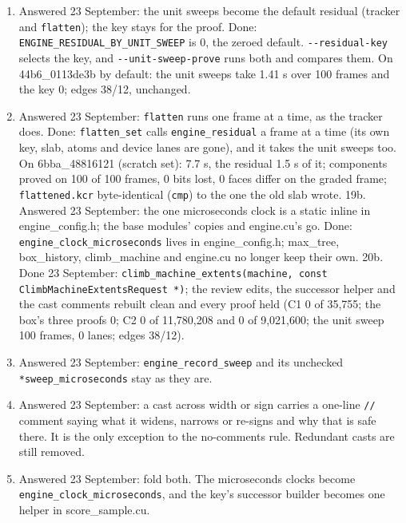 \begin{enumerate}
\item Answered 23 September: the unit sweeps become the default residual (tracker and \texttt{flatten}); the key stays for the proof. Done: \texttt{ENGINE\_\allowbreak{}RESIDUAL\_\allowbreak{}BY\_\allowbreak{}UNIT\_\allowbreak{}SWEEP} is 0, the zeroed default. \texttt{-\allowbreak{}-\allowbreak{}residual-\allowbreak{}key} selects the key, and \texttt{-\allowbreak{}-\allowbreak{}unit-\allowbreak{}sweep-\allowbreak{}prove} runs both and compares them. On 44b6\_\allowbreak{}0113de3b by default: the unit sweeps take 1.41 s over 100 frames and the key 0; edges 38/12, unchanged.
\item Answered 23 September: \texttt{flatten} runs one frame at a time, as the tracker does. Done: \texttt{flatten\_\allowbreak{}set} calls \texttt{engine\_\allowbreak{}residual} a frame at a time (its own key, slab, atoms and device lanes are gone), and it takes the unit sweeps too. On 6bba\_\allowbreak{}48816121 (scratch set): 7.7 s, the residual 1.5 s of it; components proved on 100 of 100 frames, 0 bits lost, 0 faces differ on the graded frame; \texttt{flattened.\allowbreak{}kcr} byte-identical (\texttt{cmp}) to the one the old slab wrote. 19b. Answered 23 September: the one microseconds clock is a static inline in engine\_\allowbreak{}config.h; the base modules' copies and engine.cu's go. Done: \texttt{engine\_\allowbreak{}clock\_\allowbreak{}microseconds} lives in engine\_\allowbreak{}config.h; max\_\allowbreak{}tree, box\_\allowbreak{}history, climb\_\allowbreak{}machine and engine.cu no longer keep their own. 20b. Done 23 September: \texttt{climb\_\allowbreak{}machine\_\allowbreak{}extents(machine, const Climb\allowbreak{}Machine\allowbreak{}Extents\allowbreak{}Request *)}; the review edits, the successor helper and the cast comments rebuilt clean and every proof held (C1 0 of 35,755; the box's three proofs 0; C2 0 of 11,780,208 and 0 of 9,021,600; the unit sweep 100 frames, 0 lanes; edges 38/12).
\item Answered 23 September: \texttt{engine\_\allowbreak{}record\_\allowbreak{}sweep} and its unchecked \texttt{*sweep\_\allowbreak{}microseconds} stay as they are.
\item Answered 23 September: a cast across width or sign carries a one-line \texttt{/\allowbreak{}/\allowbreak{}} comment saying what it widens, narrows or re-signs and why that is safe there. It is the only exception to the no-comments rule. Redundant casts are still removed.
\item Answered 23 September: fold both. The microseconds clocks become \texttt{engine\_\allowbreak{}clock\_\allowbreak{}microseconds}, and the key's successor builder becomes one helper in score\_\allowbreak{}sample.cu.

\end{enumerate}
